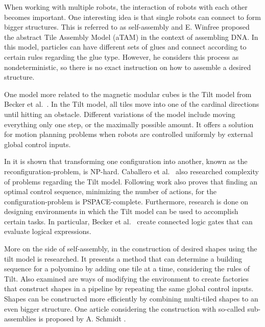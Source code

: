 When working with multiple robots, the interaction of robots with each other becomes important.
One interesting idea is that single robots can connect to form bigger structures.
This is referred to as self-assembly and E. Winfree \cite{winfree1998} proposed the abstract Tile Assembly Model (aTAM) in the context of assembling DNA.
In this model, particles can have different sets of glues and connect according to certain rules regarding the glue type.
However, he considers this process as nondeterministic, so there is no exact instruction on how to assemble a desired structure.

One model more related to the magnetic modular cubes is the Tilt model from Becker et al.\ \cite{Becker2014_SP}.
In the Tilt model, all tiles move into one of the cardinal directions until hitting an obstacle.
Different variations of the model include moving everything only one step, or the maximally possible amount.
It offers a solution for motion planning problems when robots are controlled uniformly by external global control inputs.

In \cite{Becker2014_SP} it is shown that transforming one configuration into another, known as the reconfiguration-problem, is NP-hard.
Caballero et al.\ \cite{caballero2020} also researched complexity of problems regarding the Tilt model.
Following work \cite{Becker2014} also proves that finding an optimal control sequence, minimizing the number of actions, for the configuration-problem is PSPACE-complete.
Furthermore, research is done on designing environments in which the Tilt model can be used to accomplish certain tasks.
In particular, Becker et al.\ \cite{Becker2014} create connected logic gates that can evaluate logical expressions.

More on the side of self-assembly, in \cite{Becker2020} the construction of desired shapes using the tilt model is researched.
It presents a method that can determine a building sequence for a polyomino by adding one tile at a time, considering the rules of Tilt.
Also examined are ways of modifying the environment to create factories that construct shapes in a pipeline by repeating the same global control inputs.
Shapes can be constructed more efficiently by combining multi-tiled shapes to an even bigger structure.
One article considering the construction with so-called sub-assemblies is proposed by A. Schmidt \cite{Schmidt2018}.

